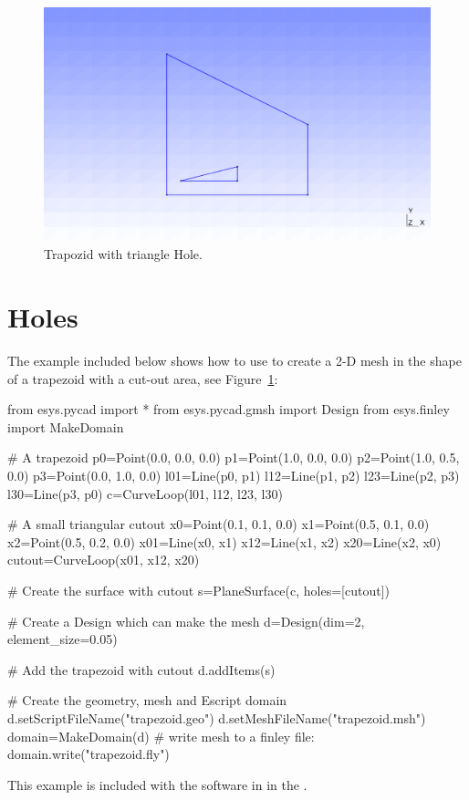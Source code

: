 \begin{figure}
\centerline{\includegraphics[width=\figwidth]{figures/trap.eps}}
\caption{Trapozid with triangle Hole.}
\label{fig:PYCAD 1}
\end{figure}


\section{Holes}
The example included below shows how to use \pycad to create a 2-D mesh
in the shape of a trapezoid with a cut-out area, see  Figure~\ref{fig:PYCAD 1}:
\begin{python}
from esys.pycad import *
from esys.pycad.gmsh import Design
from esys.finley import MakeDomain

# A trapezoid
p0=Point(0.0, 0.0, 0.0)
p1=Point(1.0, 0.0, 0.0)
p2=Point(1.0, 0.5, 0.0)
p3=Point(0.0, 1.0, 0.0)
l01=Line(p0, p1)
l12=Line(p1, p2)
l23=Line(p2, p3)
l30=Line(p3, p0)
c=CurveLoop(l01, l12, l23, l30)

# A small triangular cutout
x0=Point(0.1, 0.1, 0.0)
x1=Point(0.5, 0.1, 0.0)
x2=Point(0.5, 0.2, 0.0)
x01=Line(x0, x1)
x12=Line(x1, x2)
x20=Line(x2, x0)
cutout=CurveLoop(x01, x12, x20)

# Create the surface with cutout
s=PlaneSurface(c, holes=[cutout])

# Create a Design which can make the mesh
d=Design(dim=2, element_size=0.05)

# Add the trapezoid with cutout
d.addItems(s)

# Create the geometry, mesh and Escript domain
d.setScriptFileName("trapezoid.geo")
d.setMeshFileName("trapezoid.msh")
domain=MakeDomain(d)
# write mesh to a finley file:
domain.write("trapezoid.fly")
\end{python}
This example is included with the software in
 in the \ExampleDirectory. 

